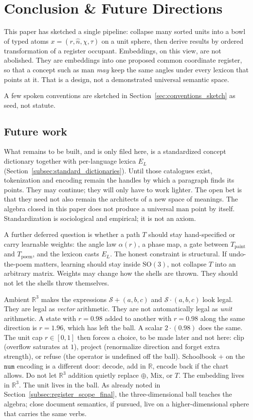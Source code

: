 \documentclass[12pt, a4paper]{article}
\begin{document}
\section{Conclusion \& Future Directions}
\label{sec:conclusion}

This paper has sketched a single pipeline: collapse many sorted units
into a bowl of typed atoms $x=(r,\hat n,\chi,\tau)$ on a unit sphere,
then derive results by ordered transformation of a register occupant.
Embeddings, on this view, are
not abolished. They are embeddings into one proposed common coordinate
register, so that a
concept such as $\mathrm{man}$ \emph{may} keep the same angles under every
lexicon that points at it. That is a design, not a demonstrated
universal semantic space.

A few spoken conventions are sketched in
Section~\ref{sec:conventions_sketch} as seed, not statute.

\subsection{Future work}
\label{subsec:future_work}
What remains to be built, and is only filed here, is a standardized
concept dictionary together with per-language lexica $E_L$
(Section~\ref{subsec:standard_dictionaries}). Until those catalogues
exist, tokenization and encoding remain the handles by which a
paragraph finds its points. They may continue; they will only have to
work lighter. The open bet is that they need not also
remain the architects of a new space of meanings.
The algebra closed in this paper does not produce a universal
$\mathrm{man}$ point by itself. Standardization is sociological and
empirical; it is not an axiom.

A further deferred question is whether a path $T$ should stay
hand-specified or carry learnable weights: the angle law
$\alpha(r)$, a phase map, a gate between $T_{\mathrm{paint}}$ and
$T_{\mathrm{poem}}$, and the lexicon casts $E_L$. The honest
constraint is structural. If undo-the-poem matters, learning should
stay inside $\mathrm{SO}(3)$, not collapse $T$ into an arbitrary
matrix. Weights may change how the shells are thrown. They should
not let the shells throw themselves.

Ambient $\mathbb{R}^3$ makes the expressions
$\mathcal{S}+(a,b,c)$ and $\mathcal{S}\cdot(a,b,c)$ look legal.
They are legal as \emph{vector} arithmetic. They are not automatically
legal as \emph{unit} arithmetic. A state with $r=0.98$ added to
another with $r=0.98$ along the same direction is $r=1.96$, which
has left the ball. A scalar $2\cdot(0.98)$ does the same. The unit
cap $r\in[0,1]$ then forces a choice, to be made later and not
here: clip (overflow saturates at $1$), project (renormalize
direction and forget extra strength), or refuse (the operator is
undefined off the ball). Schoolbook $+$ on the $\mathtt{num}$
encoding is a different door: decode, add in $\mathbb{R}$, encode
back if the chart allows. Do not let $\mathbb{R}^3$ addition
quietly replace $\oplus$, $\mathrm{Mix}$, or $T$. The embedding
lives in $\mathbb{R}^3$. The unit lives in the ball.
As already noted in Section~\ref{subsec:register_scope_final},
the three-dimensional ball teaches the algebra; close document
semantics, if pursued, live on a higher-dimensional sphere that
carries the same verbs.
\end{document}
